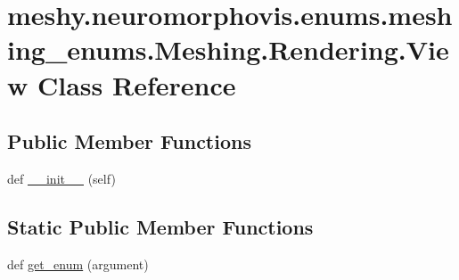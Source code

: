 \hypertarget{classmeshy_1_1neuromorphovis_1_1enums_1_1meshing__enums_1_1Meshing_1_1Rendering_1_1View}{}\section{meshy.\+neuromorphovis.\+enums.\+meshing\+\_\+enums.\+Meshing.\+Rendering.\+View Class Reference}
\label{classmeshy_1_1neuromorphovis_1_1enums_1_1meshing__enums_1_1Meshing_1_1Rendering_1_1View}


 


\subsection*{Public Member Functions}
\begin{DoxyCompactItemize}
\item 
def \hyperlink{classmeshy_1_1neuromorphovis_1_1enums_1_1meshing__enums_1_1Meshing_1_1Rendering_1_1View_a6d5496d9449590d73f40ef632a27f1c5}{\+\_\+\+\_\+init\+\_\+\+\_\+} (self)\hypertarget{classmeshy_1_1neuromorphovis_1_1enums_1_1meshing__enums_1_1Meshing_1_1Rendering_1_1View_a6d5496d9449590d73f40ef632a27f1c5}{}\label{classmeshy_1_1neuromorphovis_1_1enums_1_1meshing__enums_1_1Meshing_1_1Rendering_1_1View_a6d5496d9449590d73f40ef632a27f1c5}

\end{DoxyCompactItemize}
\subsection*{Static Public Member Functions}
\begin{DoxyCompactItemize}
\item 
def \hyperlink{classmeshy_1_1neuromorphovis_1_1enums_1_1meshing__enums_1_1Meshing_1_1Rendering_1_1View_a9bf4f7a4a34b29a3a030549b2f85b458}{get\+\_\+enum} (argument)\hypertarget{classmeshy_1_1neuromorphovis_1_1enums_1_1meshing__enums_1_1Meshing_1_1Rendering_1_1View_a9bf4f7a4a34b29a3a030549b2f85b458}{}\label{classmeshy_1_1neuromorphovis_1_1enums_1_1meshing__enums_1_1Meshing_1_1Rendering_1_1View_a9bf4f7a4a34b29a3a030549b2f85b458}

\end{DoxyCompactItemize}
